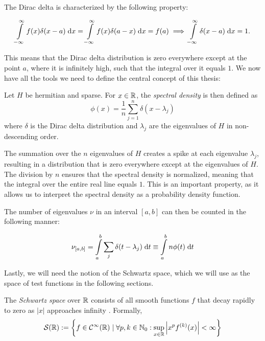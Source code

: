 The Dirac delta is characterized by the following property:

\[
\int\limits_{-\infty}^{\infty} f(x) \delta(x-a) \;\mathrm{d}x = \int\limits_{-\infty}^{\infty} f(x) \delta(a-x) \;\mathrm{d}x = f(a) \implies \int\limits_{-\infty}^{\infty} \delta(x-a) \;\mathrm{d}x = 1.
\]

This means that the Dirac delta distribution is zero everywhere except at the point $a$, where it is infinitely high, such that the integral over it equals $1$. We now have all the tools we need to define the central concept of this thesis:

\begin{definition}
    Let $H$ be hermitian and sparse.
    For $x \in \mathbb{R}$, the \emph{spectral density} is then defined as
    \[
    \phi(x) = \frac{1}{n} \sum_{j=1}^{n} \delta(x - \lambda_j)
    \]
    where $\delta$ is the Dirac delta distribution
    and $\lambda_j$ are the eigenvalues of $H$ in non-descending order.
\end{definition}

The summation over the $n$ eigenvalues of $H$ creates a spike at each eigenvalue $\lambda_j$, resulting in a distribution that is zero everywhere except at the eigenvalues of $H$. The division by $n$ ensures that the spectral density is normalized, meaning that the integral over the entire real line equals $1$. This is an important property, as it allows us to interpret the spectral density as a probability density function.

The number of eigenvalues $\nu$ in an interval $[a, b]$ can then be counted in the following manner:

\begin{equation} \label{eq:nu_a_b}
    \nu_{[a, b]} = \int\limits_a^b \sum_j \delta(t - \lambda_j) \;\mathrm{d}t \equiv \int\limits_a^b n \phi(t) \;\mathrm{d}t
\end{equation}

Lastly, we will need the notion of the Schwartz space, which we will use as the space of test functions in the following sections.

\begin{definition} \label{def:Schwartz space}
    The \emph{Schwartz space} over $\mathbb{R}$ consists of all smooth functions $f$ that decay rapidly to zero as $|x|$ approaches infinity \cite{richtmyer}.
    Formally,
    \[
    \mathcal{S}(\mathbb{R}) := \left\{f \in \mathcal{C}^{\infty}(\mathbb{R}) \mid \forall p, k \in \mathbb{N}_0: \sup_{x \in \mathbb{R}} \left| x^p f^{(k)}(x) \right| < \infty \right\}
    \]
\end{definition}